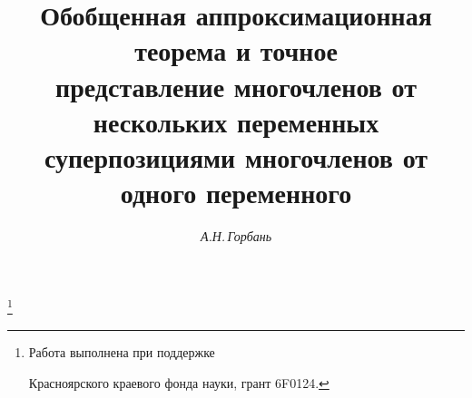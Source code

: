 







\newcommand{\tts}[1]{}







 


\setcounter{page}{6}












\author{\it А.Н.\,Горбань}




\title{Обобщенная аппроксимационная теорема и точное\\


представление многочленов от нескольких переменных\\


суперпозициями многочленов от одного переменного}





\thanks{Работа выполнена при поддержке


Красноярского краевого фонда науки, грант 6F0124.}


\date{}







\pagestyle{plain} %













